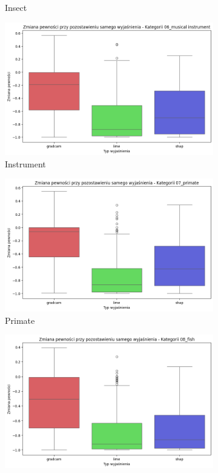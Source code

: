 \begin{figure}[h]
\begin{subfigure}[b]{0.3\textwidth}
		\caption{Insect}  \label{rys:base_confidence_exp_insect}
	\end{subfigure}
	\begin{subfigure}[b]{0.3\textwidth}
		\centering\includegraphics[width=.9\textwidth]{img/base_confidence_exp_music}
		\caption{Instrument}  \label{rys:base_confidence_exp_music}
	\end{subfigure}
	\begin{subfigure}[b]{0.3\textwidth}
		\centering\includegraphics[width=.9\textwidth]{img/base_confidence_exp_primate}
		\caption{Primate}  \label{rys:base_confidence_exp_primate}
	\end{subfigure}
	\begin{subfigure}[b]{0.3\textwidth}
		\centering\includegraphics[width=.9\textwidth]{img/base_confidence_exp_fish}

\end{subfigure}
\end{figure}
